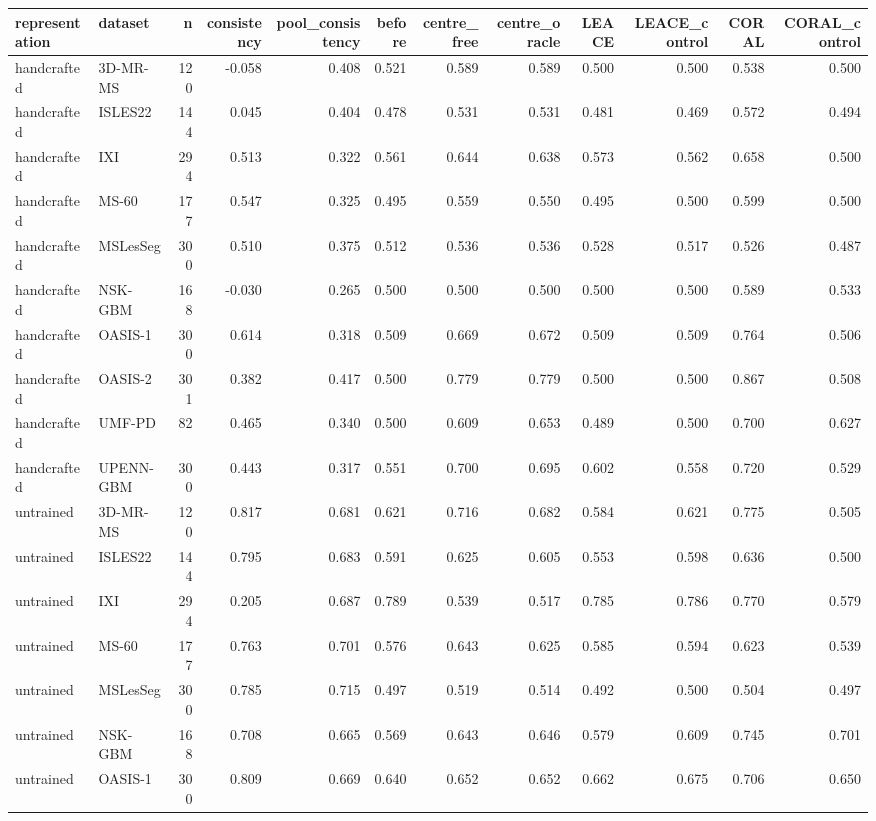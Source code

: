 \begin{tabular}{llrrrrrrrrrr}
\toprule
representation & dataset & n & consistency & pool\_consistency & before & centre\_free & centre\_oracle & LEACE & LEACE\_control & CORAL & CORAL\_control \\
\midrule
handcrafted & 3D-MR-MS & 120 & -0.058 & 0.408 & 0.521 & 0.589 & 0.589 & 0.500 & 0.500 & 0.538 & 0.500 \\
handcrafted & ISLES22 & 144 & 0.045 & 0.404 & 0.478 & 0.531 & 0.531 & 0.481 & 0.469 & 0.572 & 0.494 \\
handcrafted & IXI & 294 & 0.513 & 0.322 & 0.561 & 0.644 & 0.638 & 0.573 & 0.562 & 0.658 & 0.500 \\
handcrafted & MS-60 & 177 & 0.547 & 0.325 & 0.495 & 0.559 & 0.550 & 0.495 & 0.500 & 0.599 & 0.500 \\
handcrafted & MSLesSeg & 300 & 0.510 & 0.375 & 0.512 & 0.536 & 0.536 & 0.528 & 0.517 & 0.526 & 0.487 \\
handcrafted & NSK-GBM & 168 & -0.030 & 0.265 & 0.500 & 0.500 & 0.500 & 0.500 & 0.500 & 0.589 & 0.533 \\
handcrafted & OASIS-1 & 300 & 0.614 & 0.318 & 0.509 & 0.669 & 0.672 & 0.509 & 0.509 & 0.764 & 0.506 \\
handcrafted & OASIS-2 & 301 & 0.382 & 0.417 & 0.500 & 0.779 & 0.779 & 0.500 & 0.500 & 0.867 & 0.508 \\
handcrafted & UMF-PD & 82 & 0.465 & 0.340 & 0.500 & 0.609 & 0.653 & 0.489 & 0.500 & 0.700 & 0.627 \\
handcrafted & UPENN-GBM & 300 & 0.443 & 0.317 & 0.551 & 0.700 & 0.695 & 0.602 & 0.558 & 0.720 & 0.529 \\
untrained & 3D-MR-MS & 120 & 0.817 & 0.681 & 0.621 & 0.716 & 0.682 & 0.584 & 0.621 & 0.775 & 0.505 \\
untrained & ISLES22 & 144 & 0.795 & 0.683 & 0.591 & 0.625 & 0.605 & 0.553 & 0.598 & 0.636 & 0.500 \\
untrained & IXI & 294 & 0.205 & 0.687 & 0.789 & 0.539 & 0.517 & 0.785 & 0.786 & 0.770 & 0.579 \\
untrained & MS-60 & 177 & 0.763 & 0.701 & 0.576 & 0.643 & 0.625 & 0.585 & 0.594 & 0.623 & 0.539 \\
untrained & MSLesSeg & 300 & 0.785 & 0.715 & 0.497 & 0.519 & 0.514 & 0.492 & 0.500 & 0.504 & 0.497 \\
untrained & NSK-GBM & 168 & 0.708 & 0.665 & 0.569 & 0.643 & 0.646 & 0.579 & 0.609 & 0.745 & 0.701 \\
untrained & OASIS-1 & 300 & 0.809 & 0.669 & 0.640 & 0.652 & 0.652 & 0.662 & 0.675 & 0.706 & 0.650 \\

\end{tabular}
